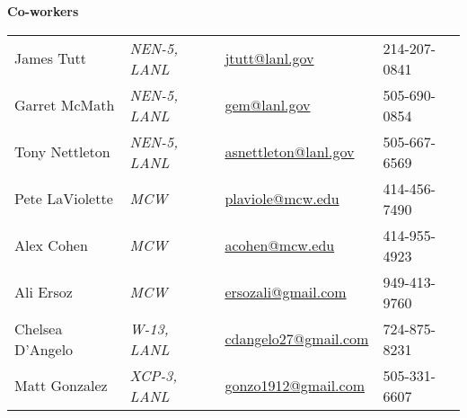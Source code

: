 \begin{minipage}{0.48\textwidth} \footnotesize
\begin{center}
{\normalsize \textbf{Co-workers}} \vspace{1mm} %
\end{center}
\begin{tabular}{llll}
James Tutt    & \textit{NEN-5, LANL} & \href{mailto:jtutt@lanl.gov}{jtutt@lanl.gov} & 214-207-0841 \\
Garret McMath &  \textit{NEN-5, LANL} & \href{mailto:gem@lanl.gov}{gem@lanl.gov}     & 505-690-0854 \\
Tony Nettleton & \textit{NEN-5, LANL} & \href{mailto:asnettleton@lanl.gov}{asnettleton@lanl.gov} & 505-667-6569 \\
Pete LaViolette & \textit{MCW} &  \href{mailto:plaviole@mcw.edu}{plaviole@mcw.edu} & 414-456-7490 \\ %
Alex Cohen & \textit{MCW} &  \href{mailto:acohen@mcw.edu}{acohen@mcw.edu} & 414-955-4923 \\
Ali Ersoz & \textit{MCW} &  \href{mailto:ersozali@gmail.com}{ersozali@gmail.com} & 949-413-9760 \\
Chelsea D'Angelo & \textit{W-13, LANL}& \href{mailto:cdangelo27@gmail.com}{cdangelo27@gmail.com} & 724-875-8231\\ %
Matt Gonzalez & {\textit{XCP-3, LANL}} & \href{mailto:gonzo1912@gmail.com}{gonzo1912@gmail.com} & 505-331-6607\\ %
\end{tabular}
\end{minipage}



